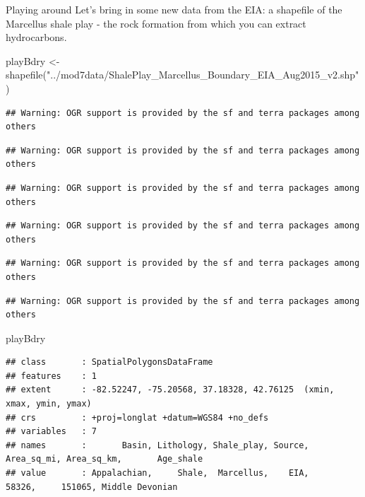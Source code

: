 \documentclass[
  ignorenonframetext,
]{beamer}
\newenvironment{Shaded}{\begin{snugshade}}{\end{snugshade}}
\newcommand{\FunctionTok}[1]{\textcolor[rgb]{0.00,0.00,0.00}{#1}}
\newcommand{\NormalTok}[1]{#1}
\newcommand{\OtherTok}[1]{\textcolor[rgb]{0.56,0.35,0.01}{#1}}
\newcommand{\StringTok}[1]{\textcolor[rgb]{0.31,0.60,0.02}{#1}}
\begin{document}
\begin{frame}[fragile]{Playing around}
\protect\hypertarget{playing-around}{}
Let's bring in some new data from the EIA: a shapefile of the Marcellus
shale play - the rock formation from which you can extract hydrocarbons.

\tiny

\begin{Shaded}
\begin{Highlighting}[]
\NormalTok{playBdry }\OtherTok{\textless{}{-}} \FunctionTok{shapefile}\NormalTok{(}\StringTok{"../mod7data/ShalePlay\_Marcellus\_Boundary\_EIA\_Aug2015\_v2.shp"}\NormalTok{)}
\end{Highlighting}
\end{Shaded}

\begin{verbatim}
## Warning: OGR support is provided by the sf and terra packages among others
\end{verbatim}

\begin{verbatim}
## Warning: OGR support is provided by the sf and terra packages among others
\end{verbatim}

\begin{verbatim}
## Warning: OGR support is provided by the sf and terra packages among others
\end{verbatim}

\begin{verbatim}
## Warning: OGR support is provided by the sf and terra packages among others
\end{verbatim}

\begin{verbatim}
## Warning: OGR support is provided by the sf and terra packages among others
\end{verbatim}

\begin{verbatim}
## Warning: OGR support is provided by the sf and terra packages among others
\end{verbatim}

\begin{Shaded}
\begin{Highlighting}[]
\NormalTok{playBdry}
\end{Highlighting}
\end{Shaded}

\begin{verbatim}
## class       : SpatialPolygonsDataFrame 
## features    : 1 
## extent      : -82.52247, -75.20568, 37.18328, 42.76125  (xmin, xmax, ymin, ymax)
## crs         : +proj=longlat +datum=WGS84 +no_defs 
## variables   : 7
## names       :       Basin, Lithology, Shale_play, Source, Area_sq_mi, Area_sq_km,       Age_shale 
## value       : Appalachian,     Shale,  Marcellus,    EIA,      58326,     151065, Middle Devonian
\end{verbatim}


\end{frame}
\end{document}
